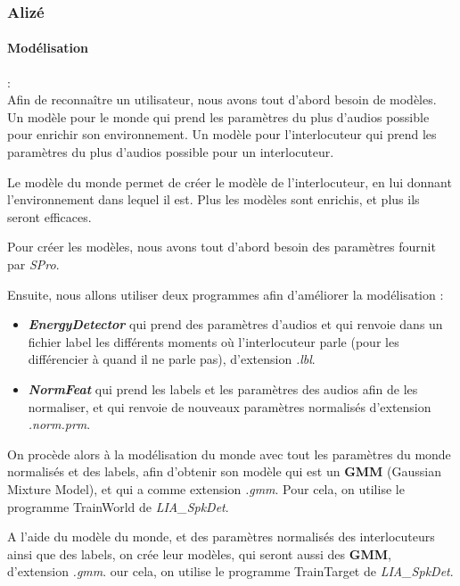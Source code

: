 \subsubsection{Alizé}
\label{sec:alizeImpl}


\paragraph*{Modélisation} : \\

Afin de reconnaître un utilisateur, nous avons tout d'abord besoin de modèles.
Un modèle pour le monde qui prend les paramètres du plus d'audios possible pour enrichir son environnement.
Un modèle pour l'interlocuteur qui prend les paramètres du plus d'audios possible pour un interlocuteur.

Le modèle du monde permet de créer le modèle de l'interlocuteur, en lui donnant l'environnement dans lequel il est.
Plus les modèles sont enrichis, et plus ils seront efficaces.

Pour créer les modèles, nous avons tout d'abord besoin des paramètres fournit par \textit{SPro}.

Ensuite, nous allons utiliser deux programmes afin d'améliorer la modélisation :
\begin{itemize}
      \item  \textit{\textbf{EnergyDetector}} qui prend des paramètres d'audios et qui renvoie dans un fichier label les différents moments où
            l'interlocuteur parle (pour les différencier à quand il ne parle pas), d'extension \textit{.lbl}.
      \item\textit{\textbf{ NormFeat }} qui prend les labels et les paramètres des audios afin de les normaliser, et qui renvoie de
            nouveaux paramètres normalisés d'extension \textit{.norm.prm}.
\end{itemize}


On procède alors à la modélisation du monde avec tout les paramètres du monde normalisés et des labels, afin d'obtenir son modèle qui est un \textbf{GMM}
(Gaussian Mixture Model), et qui a comme extension \textit{.gmm}.
Pour cela, on utilise le programme TrainWorld de \textit{  LIA\_SpkDet}.

A l'aide du modèle du monde, et des paramètres normalisés des interlocuteurs ainsi que des labels, on crée leur modèles, qui seront aussi des \textbf{GMM},
d'extension \textit{.gmm}.
our cela, on utilise le programme TrainTarget de \textit{ LIA\_SpkDet}.


